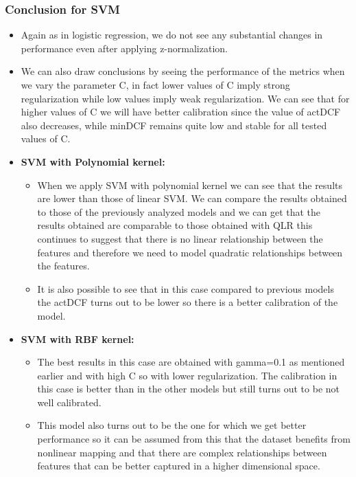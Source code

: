 \documentclass{article}
\begin{document}
\subsubsection*{Conclusion for SVM}
\begin{itemize}
    \item Again as in logistic regression, we do not see any substantial changes in performance even after applying z-normalization.
    \item We can also draw conclusions by seeing the performance of the metrics when we vary the parameter C, in fact lower values of C imply strong regularization while low values imply weak regularization. We can see that for higher values of C we will have better calibration since the value of actDCF also decreases, while minDCF remains quite low and stable for all tested values of C.
    \item \textbf{SVM with Polynomial kernel:}
    \begin{itemize}
    \item When we apply SVM with polynomial kernel we can see that the results are lower than those of linear SVM. We can compare the results obtained to those of the previously analyzed models and we can get that the results obtained are comparable to those obtained with QLR this continues to suggest that there is no linear relationship between the features and therefore we need to model quadratic relationships between the features.
    \item It is also possible to see that in this case compared to previous models the actDCF turns out to be lower so there is a better calibration of the model.
   \end{itemize}
   \item \textbf{SVM with RBF kernel:}
    \begin{itemize}
    \item The best results in this case are obtained with gamma=0.1 as mentioned earlier and with high C so with lower regularization. The calibration in this case is better than in the other models but still turns out to be not well calibrated.
    \item This model also turns out to be the one for which we get better performance so it can be assumed from this that the dataset benefits from nonlinear mapping and that there are complex relationships between features that can be better captured in a higher dimensional space.
   \end{itemize}
\end{itemize}
\end{document}
